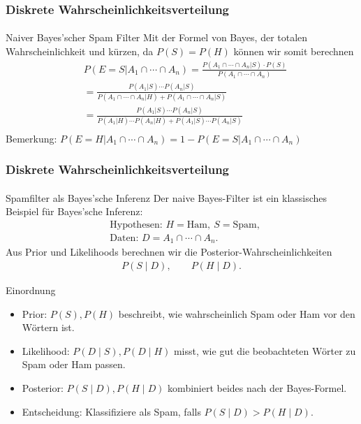 \documentclass{beamer}
\begin{document}
\begin{frame}
    \frametitle{Diskrete Wahrscheinlichkeitsverteilung}
\framesubtitle{}

\begin{block}{Naiver Bayes'scher Spam Filter}
Mit der Formel von Bayes, der totalen Wahrscheinlichkeit  und kürzen, da $P(S) = P(H)$ können wir somit berechnen
\begin{align*}
& P(E=S |  A_1 \cap \cdots \cap A_n) = \frac{P(A_1 \cap \cdots \cap A_n | S) \cdot P(S)}{P(A_1 \cap \cdots \cap A_n)} \\
&=  \frac{P(A_1 | S) \cdots P(A_n | S) }{P(A_1 \cap \cdots \cap A_n | H) + P(A_1 \cap \cdots \cap A_n | S)} \\
&=  \frac{P(A_1 | S) \cdots P(A_n | S) }{P(A_1 | H) \cdots P(A_n | H)  + P(A_1 | S) \cdots P(A_n | S) } \\
\end{align*}
Bemerkung: $P(E=H |  A_1 \cap \cdots \cap A_n) = 1- P(E=S |  A_1 \cap \cdots \cap A_n) $
\end{block}



 \end{frame}


\begin{frame}[shrink=5]
    \frametitle{Diskrete Wahrscheinlichkeitsverteilung}
\framesubtitle{}

\begin{block}{Spamfilter als Bayes'sche Inferenz}
Der naive Bayes-Filter ist ein klassisches Beispiel für Bayes'sche Inferenz:
\begin{align*}
&\text{Hypothesen: } H=\text{Ham},\ S=\text{Spam}, \\
&\text{Daten: } D = A_1 \cap \cdots \cap A_n.
\end{align*}
Aus Prior und Likelihoods berechnen wir die Posterior-Wahrscheinlichkeiten
\begin{align*}
P(S \mid D), \qquad P(H \mid D).
\end{align*}
\end{block}

\begin{block}{Einordnung}
\begin{itemize}
\item Prior: $P(S), P(H)$ beschreibt, wie wahrscheinlich Spam oder Ham vor den Wörtern ist.
\item Likelihood: $P(D \mid S), P(D \mid H)$ misst, wie gut die beobachteten Wörter zu Spam oder Ham passen.
\item Posterior: $P(S \mid D), P(H \mid D)$ kombiniert beides nach der Bayes-Formel.
\item Entscheidung: Klassifiziere als Spam, falls $P(S \mid D) > P(H \mid D)$.
\end{itemize}
\end{block}

 \end{frame}
\end{document}
